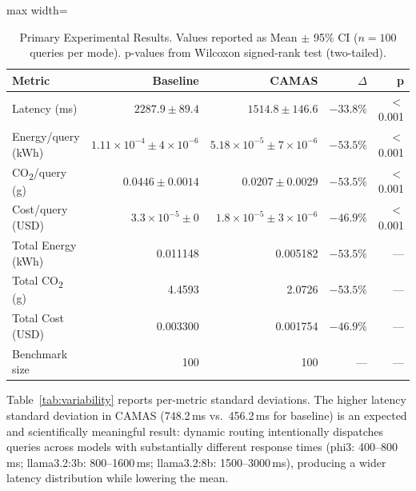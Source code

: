 \documentclass[journal]{IEEEtran}
\begin{document}
\begin{table}[!htbp]
\renewcommand{\arraystretch}{1.3}
\centering
\caption{Primary Experimental Results. Values reported as Mean $\pm$ 95\% CI
($n = 100$ queries per mode). p-values from Wilcoxon signed-rank test
(two-tailed).}
\label{tab:main}
\begin{adjustbox}{max width=\linewidth}\begin{tabular}{@{}lrrrr@{}}
\toprule
\textbf{Metric} & \textbf{Baseline} & \textbf{CAMAS} & \textbf{$\Delta$} & \textbf{p} \\
\midrule
Latency (ms)
  & $2287.9 \pm 89.4$
  & $1514.8 \pm 146.6$
  & $-33.8\%$ & $<$0.001 \\
Energy/query (kWh)
  & $1.11 \times 10^{-4} \pm 4 \times 10^{-6}$
  & $5.18 \times 10^{-5} \pm 7 \times 10^{-6}$
  & $-53.5\%$ & $<$0.001 \\
CO\textsubscript{2}/query (g)
  & $0.0446 \pm 0.0014$
  & $0.0207 \pm 0.0029$
  & $-53.5\%$ & $<$0.001 \\
Cost/query (USD)
  & $3.3 \times 10^{-5} \pm 0$
  & $1.8 \times 10^{-5} \pm 3 \times 10^{-6}$
  & $-46.9\%$ & $<$0.001 \\
\midrule
Total Energy (kWh)  & 0.011148 & 0.005182 & $-53.5\%$ & --- \\
Total CO\textsubscript{2} (g) & 4.4593 & 2.0726 & $-53.5\%$ & --- \\
Total Cost (USD)    & 0.003300 & 0.001754 & $-46.9\%$ & --- \\
Benchmark size      & 100      & 100      & ---        & --- \\
\bottomrule
\end{tabular}\end{adjustbox}
\end{table}

Table~\ref{tab:variability} reports per-metric standard deviations. The higher
latency standard deviation in CAMAS (748.2\,ms vs.\ 456.2\,ms for baseline)
is an expected and scientifically meaningful result: dynamic routing
intentionally dispatches queries across models with substantially different
response times (phi3: 400--800\,ms; llama3.2:3b: 800--1600\,ms;
llama3.2:8b: 1500--3000\,ms), producing a wider latency distribution while
lowering the mean.
\end{document}
